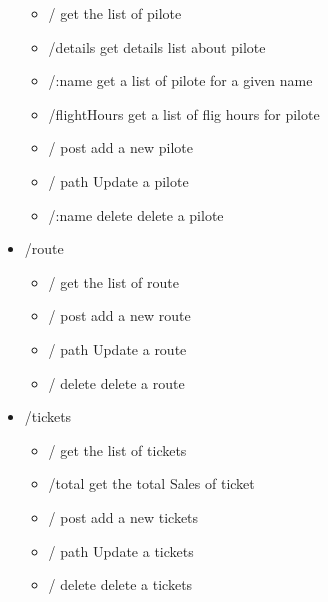 \documentclass{article}
\begin{document}
\begin{itemize}
\begin{itemize}
                \item / get the list of pilote
                \item /details get details list about pilote
                \item /:name get a list of pilote for a given name
                \item /flightHours get a list of flig hours for pilote
                \item / post add a new pilote  
                \item / path Update a pilote
                \item /:name delete delete a pilote
            \end{itemize}
        \item /route
            \begin{itemize}
                \item / get the list of route
                \item / post add a new route  
                \item / path Update a route
                \item / delete delete a route
            \end{itemize}
        \item /tickets
            \begin{itemize}
                \item / get the list of tickets
                \item /total get the total Sales of ticket
                \item / post add a new tickets  
                \item / path Update a tickets
                \item / delete delete a tickets
            \end{itemize}
    \end{itemize}
\end{document}
